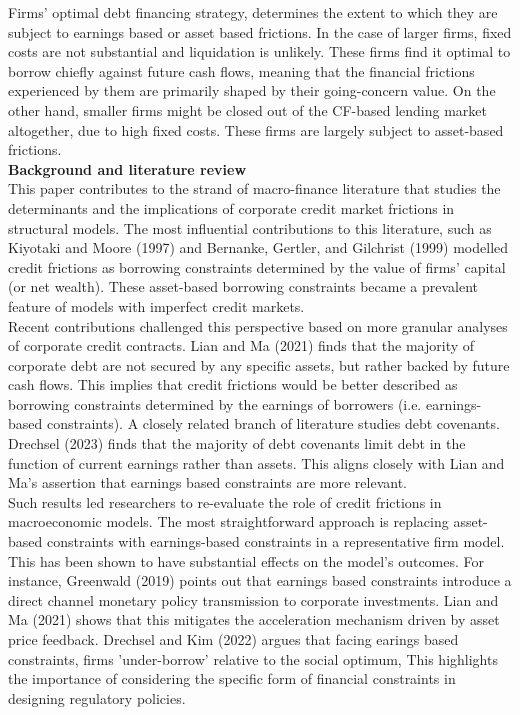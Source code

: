 \documentclass[12pt]{article}
\begin{document}
Firms' optimal debt financing strategy, determines the extent to which they are subject to earnings based or asset based frictions. In the case of larger firms, fixed costs are not substantial and liquidation is unlikely. These firms find it optimal to borrow chiefly against future cash flows, meaning that the financial frictions experienced by them are primarily shaped by their going-concern value. On the other hand, smaller firms might be closed out of the CF-based lending market altogether, due to high fixed costs. These firms are largely subject to asset-based frictions.   \vspace{3mm} \\
\textbf{Background and literature review} \\
This paper contributes to the strand of macro-finance literature that studies the determinants and the implications of corporate credit market frictions in structural models. The most influential contributions to this literature, such as Kiyotaki and Moore (1997) and Bernanke, Gertler, and Gilchrist (1999) modelled credit frictions as borrowing constraints determined by the value of firms' capital (or net wealth). These asset-based borrowing constraints became a prevalent feature of models with imperfect credit markets.  \vspace{3mm} \\ 
Recent contributions challenged this perspective based on more granular analyses of corporate credit contracts. Lian and Ma (2021) finds that the majority of corporate debt are not secured by any specific assets, but rather backed by future cash flows. This implies that credit frictions would be better described as borrowing constraints determined by the earnings of borrowers (i.e. earnings-based constraints). A closely related branch of literature studies debt covenants. Drechsel (2023) finds that the majority of debt covenants limit debt in the function of current earnings rather than assets. This aligns closely with Lian and Ma's assertion that earnings based constraints are more relevant. \vspace{3mm} \\
Such results led researchers to re-evaluate the role of credit frictions in macroeconomic models. The most straightforward approach is replacing asset-based constraints with earnings-based constraints in a representative firm model. This has been shown to have substantial effects on the model's outcomes. For instance, Greenwald (2019) points out that earnings based constraints introduce a direct channel monetary policy transmission to corporate investments. Lian and Ma (2021) shows that this mitigates the acceleration mechanism driven by asset price feedback. Drechsel and Kim (2022) argues that facing earings based constraints, firms 'under-borrow' relative to the social optimum, This highlights the importance of considering the specific form of financial constraints in designing regulatory policies.  \vspace{3mm} \\
\end{document}

